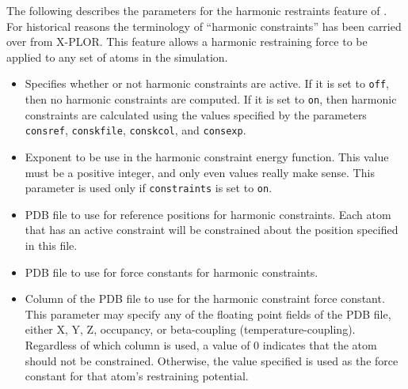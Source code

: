 The following describes the parameters for the 
harmonic restraints feature of \NAMD.
For historical reasons the terminology of 
``harmonic constraints'' has been carried over from X-PLOR.  
This feature allows a harmonic restraining force to be applied 
to any set of atoms in the simulation.

\begin{itemize}

\item
{}
{Specifies whether or not harmonic constraints are active.  If it 
is set to {\tt off}, then no harmonic constraints are computed.  
If it is set to {\tt on}, then 
harmonic constraints are calculated using the values specified 
by the parameters {\tt consref}, {\tt conskfile}, {\tt conskcol}, 
and {\tt consexp}.}

\item
{}
{Exponent to be use in the harmonic constraint energy function.  
This value must be a positive integer, and only even values really make 
sense.  This parameter is used only if {\tt constraints} is set to 
{\tt on}.}

\item
{}
{PDB file to use for reference positions for harmonic constraints.  
Each atom that has an active constraint will be constrained about 
the position specified in this file.}

\item
{}
{PDB file to use for force constants for 
harmonic constraints.}

\item
{}
{Column of the PDB file to use for the harmonic constraint force constant.
This parameter may specify any of the floating point fields of the PDB file, 
either X, Y, Z, occupancy, or beta-coupling (temperature-coupling).  
Regardless of which column is used, a value of 0 indicates that the atom 
should not be constrained.  
Otherwise, the value specified is used as the force constant for 
that atom's restraining potential.}


\end{itemize}
